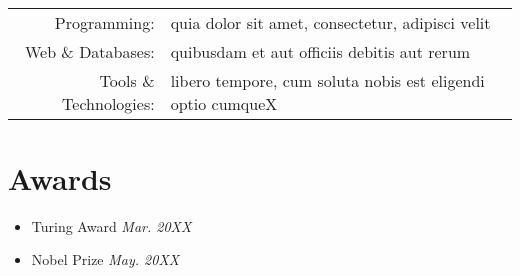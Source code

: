 \documentclass[letterpaper,10pt]{article}
\newcommand{\skills}[3]{
    \vspace{-2pt}
    \ \ \ \ \ \ \ \ \ \ \ 
    \begin{tabular}{r!{\color{burgundy}\vrule}l}
          Programming: & #1 \\
          Web \& Databases: & #2 \\
          Tools \& Technologies: & #3
    \end{tabular}
    \vspace{4pt}
}
\newcommand{\activity}[2]{
    \item #1 \hfill{\emph{#2}}      
}
\newcommand{\bulletsBeginn}{
    \vspace{1pt}
    \begin{minipage}{18cm} 
    \begin{itemize}[leftmargin=0.6cm]
}
\newcommand{\bulletsEndd}{
    \end{itemize}\vspace{0pt}
    \end{minipage}
}
\begin{document}
    \skills
        {quia dolor sit amet, consectetur, adipisci velit}               %
        {quibusdam et aut officiis debitis aut rerum}               %
        { libero tempore, cum soluta nobis est eligendi optio cumqueX}                             %

    
    \section{Awards}

    \bulletsBeginn
        \activity{Turing Award}{Mar. 20XX}
        \vspace{-4pt}
        \activity{Nobel Prize}{May. 20XX}
    \bulletsEndd

\end{document}
